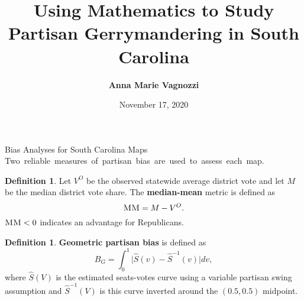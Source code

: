 \documentclass[xcolor=dvipsnames,table]{beamer}
\title[INFORMS 2021]{Using Mathematics to Study Partisan Gerrymandering in South Carolina}
\author{\textbf{Anna Marie Vagnozzi}}
\institute{Clemson University \\ In collaboration with Matthew Saltzman}
\date{November 17, 2020}
\theoremstyle{plain}
\theoremstyle{definition}
\newtheorem{defn}[thm]{Definition}
\begin{document}






\begin{frame}{Bias Analyses for South Carolina Maps}
		\mbox{Two reliable measures of partisan bias are used to assess each map.}
		
		\begin{defn}
		\small Let $V^O$ be the observed statewide average district vote and let $M$ be the median district vote share. The \textbf{median-mean} metric is defined as $$\textsc{MM}=M-V^O.$$
		$\textsc{MM}<0$ indicates an advantage for Republicans.
		\end{defn}
		
		\begin{defn}
	\small	\textbf{Geometric partisan bias} is defined as 
		$$B_G=\int_0^1\Big|\widehat{S}(v)-\widehat{S}^{-1}(v)\Big|dv,$$
		where $\widehat{S}(V)$ is the estimated seats-votes curve using a variable partisan swing assumption and $\widehat{S}^{-1}(V)$ is this curve inverted around the $(0.5,0.5)$ midpoint.
		\end{defn}
\end{frame}

\end{document}
